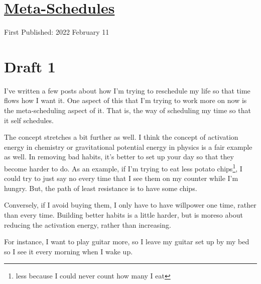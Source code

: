 \documentclass[12pt]{article}[titlepage]
\newcommand{\1}{\={a}}
\newcommand{\2}{\={e}}
\newcommand{\3}{\={\i}}
\newcommand{\4}{\=o}
\newcommand{\5}{\=u}
\newcommand{\6}{\={A}}
\renewcommand{\,}{\textsuperscript{,}}
\begin{document}
\doublespacing
\section{\href{meta-schedules.html}{Meta-Schedules}}
First Published: 2022 February 11

\section{Draft 1}
I've written a few posts about how I'm trying to reschedule my life so that time flows how I want it.
One aspect of this that I'm trying to work more on now is the meta-scheduling aspect of it.
That is, the way of scheduling my time so that it self schedules.

The concept stretches a bit further as well.
I think the concept of activation energy in chemistry or gravitational potential energy in physics is a fair example as well.
In removing bad habits, it's better to set up your day so that they become harder to do.
As an example, if I'm trying to eat less potato chips\footnote{less because I could never count how many I eat}, I could try to just say no every time that I see them on my counter while I'm hungry.
But, the path of least resistance is to have some chips.

Conversely, if I avoid buying them, I only have to have willpower one time, rather than every time.
Building better habits is a little harder, but is moreso about reducing the activation energy, rather than increasing.

For instance, I want to play guitar more, so I leave my guitar set up by my bed so I see it every morning when I wake up.
\end{document}
